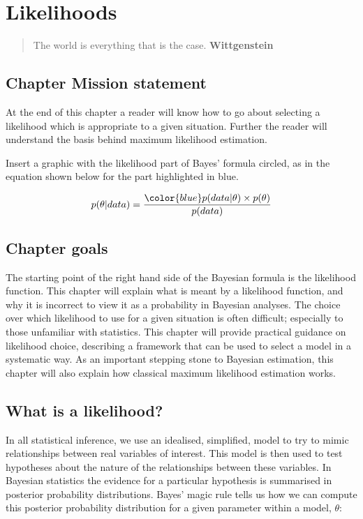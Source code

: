 \documentclass[11pt,fullpage]{book}
\begin{document}
\chapter{Likelihoods}\label{chap:Likelihoods}
\begin{quotation}
The world is everything that is the case. \textbf{Wittgenstein}
\end{quotation}

\section{Chapter Mission statement}
At the end of this chapter a reader will know how to go about selecting a likelihood which is appropriate to a given situation. Further the reader will understand the basis behind maximum likelihood estimation.

Insert a graphic with the likelihood part of Bayes' formula circled, as in the equation shown below for the part highlighted in blue.

\begin{equation}
p(\theta|data) = \frac{{\color{blue}p(data|\theta)}\times p(\theta)}{p(data)}
\end{equation}\label{eq:Likelihood_BayesHighlighted}

\section{Chapter goals}
The starting point of the right hand side of the Bayesian formula is the likelihood function. This chapter will explain what is meant by a likelihood function, and why it is incorrect to view it as a probability in Bayesian analyses. The choice over which likelihood to use for a given situation is often difficult; especially to those unfamiliar with statistics. This chapter will provide practical guidance on likelihood choice, describing a framework that can be used to select a model in a systematic way. As an important stepping stone to Bayesian estimation, this chapter will also explain how classical maximum likelihood estimation works. 

\section{What is a likelihood?}
In all statistical inference, we use an idealised, simplified, model to try to mimic relationships between real variables of interest. This model is then used to test hypotheses about the nature of the relationships between these variables. In Bayesian statistics the evidence for a particular hypothesis is summarised in posterior probability distributions. Bayes' magic rule tells us how we can compute this posterior probability distribution for a given parameter within a model, $\theta$:
\end{document}
